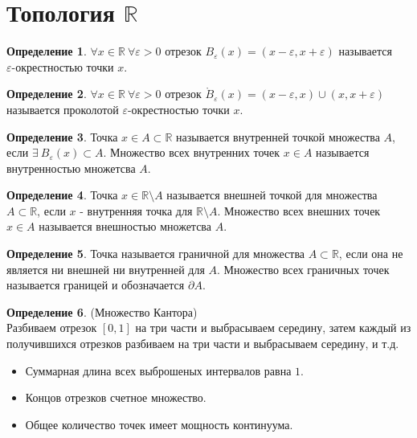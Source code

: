 \documentclass[a4paper, 12pt]{article}
\newcommand{\R}{\mathbb{R}}
\renewcommand{\epsilon}{\varepsilon}
\theoremstyle{definition}
\newtheorem*{definition}{Определение}
\begin{document}
    \section{Топология $\R$}
        \begin{definition}
            $\forall x\in \R \ \forall \epsilon>0$ отрезок $B_{\epsilon}(x)=(x-\epsilon, x+\epsilon)$ называется\\ $\epsilon$-окрестностью точки $x$.
        \end{definition}
        \begin{definition}
            $\forall x\in \R \ \forall \epsilon>0$ отрезок $\mathring{B}_{\epsilon}(x)=(x-\epsilon,x)\cup(x,x+\epsilon)$ называется проколотой $\epsilon$-окрестностью точки $x$.
        \end{definition} 
        \begin{definition}
            Точка $x\in A\subset \R$ называется внутренней точкой множества $A$, если $\exists \ B_{\epsilon}(x)\subset A$. Множество всех внутренних точек $x\in A$ называется внутренностью множетсва $A$.
        \end{definition} 
        \begin{definition}
            Точка $x\in \R\setminus A$ называется внешней точкой для множества $A\subset \R$, если $x$ - внутренняя точка для $\R\setminus A$. Множество всех внешних точек $x\in A$ называется внешностью множетсва $A$.
        \end{definition}
        \begin{definition}
            Точка называется граничной для множества $A\subset \R$, если она не является ни внешней ни внутренней для $A$. Множество всех граничных точек называется границей и обозначается $\partial A$.
        \end{definition}
        \begin{definition} (Множество Кантора)\\
            Разбиваем отрезок $[0,1]$ на три части и выбрасываем середину, затем каждый из получившихся отрезков разбиваем на три части и выбрасываем середину, и т.д.
            \begin{itemize}
                \item Суммарная длина всех выброшеных интервалов равна $1$.
                \item Концов отрезков счетное множество.
                \item Общее количество точек имеет мощность континуума.
            \end{itemize}
        \end{definition} 
\end{document}
